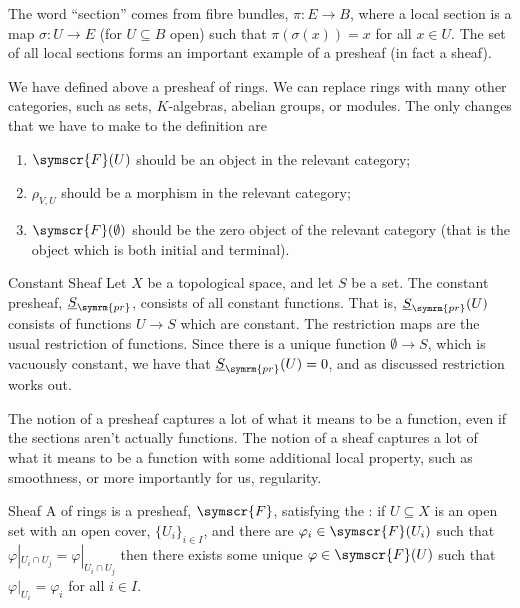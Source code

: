 \documentclass[fleqn]{NotesClass}
\newcommand{\sheaf}[1]{\symscr{#1}}
\begin{document}
    The word \enquote{section} comes from fibre bundles, \(\pi \colon E \to B\), where a local section is a map \(\sigma \colon U \to E\) (for \(U \subseteq B\) open) such that \(\pi(\sigma(x)) = x\) for all \(x \in U\).
    The set of all local sections forms an important example of a presheaf (in fact a sheaf).
    
    \begin{remark}{}{}
        We have defined above a presheaf of rings.
        We can replace rings with many other categories, such as sets, \(K\)-algebras, abelian groups, or modules.
        The only changes that we have to make to the definition are
        \begin{enumerate}
            \item \(\sheaf{F}(U)\) should be an object in the relevant category;
            \item \(\rho_{V,U}\) should be a morphism in the relevant category;
            \item \(\sheaf{F}(\emptyset)\) should be the zero object of the relevant category (that is the object which is both initial and terminal).
        \end{enumerate}
    \end{remark}
    
    \begin{exm}{Constant Sheaf}{}
        Let \(X\) be a topological space, and let \(S\) be a set.
        The constant presheaf, \(\underline{S}_{\symrm{pr}}\), consists of all constant functions.
        That is, \(\underline{S}_{\symrm{pr}}(U)\) consists of functions \(U \to S\) which are constant.
        The restriction maps are the usual restriction of functions.
        Since there is a unique function \(\emptyset \to S\), which is vacuously constant, we have that \(\underline{S}_{\symrm{pr}}(U) = 0\), and as discussed restriction works out.
    \end{exm}
    
    The notion of a presheaf captures a lot of what it means to be a function, even if the sections aren't actually functions.
    The notion of a sheaf captures a lot of what it means to be a function with some additional local property, such as smoothness, or more importantly for us, regularity.
    
    \begin{dfn}{Sheaf}{}
        A  of rings is a presheaf, \(\sheaf{F}\), satisfying the : if \(U \subseteq X\) is an open set with an open cover, \(\{U_i\}_{i \in I}\), and there are \(\varphi_i \in \sheaf{F}(U_i)\) such that \(\varphi|_{U_i \cap U_j} = \varphi|_{U_i \cap U_j}\) then there exists some unique \(\varphi \in \sheaf{F}(U)\) such that \(\varphi|_{U_i} = \varphi_i\) for all \(i \in I\).
    \end{dfn}
    
\end{document}
